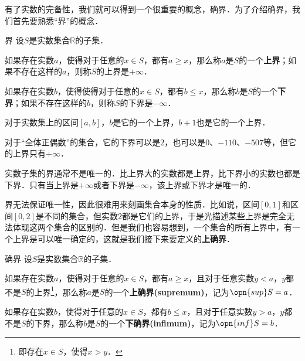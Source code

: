 
\begin{issues}
\issueDraft
\end{issues}


有了实数的完备性，我们就可以得到一个很重要的概念，确界．为了介绍确界，我们首先要熟悉“界”的概念．

\begin{definition}{界}
设$S$是实数集合$\mathbb{R}$的子集．

如果存在实数$a$，使得对于任意的$x\in S$，都有$a\geq x$，那么称$a$是$S$的一个\textbf{上界}；如果不存在这样的$a$，则称$S$的上界是$+\infty$．

如果存在实数$b$，使得使得对于任意的$x\in S$，都有$b\leq x$，那么称$b$是$S$的一个\textbf{下界}；如果不存在这样的$b$，则称$S$的下界是$-\infty$．
\end{definition}

\begin{example}{}
对于实数集上的区间$[a, b]$，$b$是它的一个上界，$b+1$也是它的一个上界．

对于“全体正偶数”的集合，它的下界可以是$2$，也可以是$0$、$-110$、$-507$等，但它的上界只有$+\infty$．
\end{example}

实数子集的界通常不是唯一的．比上界大的实数都是上界，比下界小的实数也都是下界．只有当上界是$+\infty$或者下界是$-\infty$，该上界或下界才是唯一的．

界无法保证唯一性，因此很难用来刻画集合本身的性质．比如说，区间$[0, 1]$和区间$[0, 2]$是不同的集合，但实数$2$都是它们的上界，于是光描述某些上界是完全无法体现这两个集合的区别的．但是我们也容易想到，一个集合的所有上界中，有一个上界是可以唯一确定的，这就是我们接下来要定义的\textbf{上确界}．

\begin{definition}{确界}
设$S$是实数集合$\mathbb{R}$的子集．

如果存在实数$a$，使得对于任意的$x\in S$，都有$a\geq x$，且对于任意实数$y<a$，$y$都不是$S$的上界\footnote{即存在$x\in S$，使得$x>y$．}，那么称$a$是$S$的一个\textbf{上确界(supremum)}，记为$\opn{sup} S=a$．

如果存在实数$b$，使得对于任意的$x\in S$，都有$b\leq x$，且对于任意实数$y>a$，$y$都不是$S$的下界，那么称$b$是$S$的一个\textbf{下确界(infimum)}，记为$\opn{inf} S=b$．



\end{definition}


